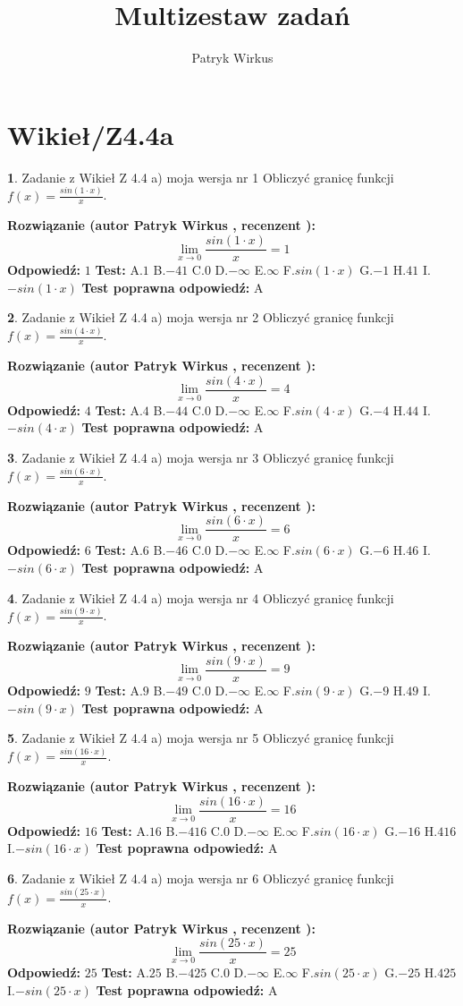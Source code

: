 \documentclass[12pt, a4paper]{article}
\title{Multizestaw zadań}
\author{Patryk Wirkus}
\date{}
\theoremstyle{definition} %
\newtheorem{zad}{}
\newcommand{\kategoria}[1]{\section{#1}}
\newcommand{\zadStart}[1]{\begin{zad}#1\newline}
\newcommand{\zadStop}{\end{zad}}
\newcommand{\rozwStart}[2]{\noindent \textbf{Rozwiązanie (autor #1 , recenzent #2): }\newline}
\newcommand{\rozwStop}{\newline}
\newcommand{\odpStart}{\noindent \textbf{Odpowiedź:}\newline}
\newcommand{\odpStop}{\newline}
\newcommand{\testStart}{\noindent \textbf{Test:}\newline}
\newcommand{\testStop}{\newline}
\newcommand{\kluczStart}{\noindent \textbf{Test poprawna odpowiedź:}\newline}
\newcommand{\kluczStop}{\newline}
\begin{document}
\maketitle

\kategoria{Wikieł/Z4.4a}


\zadStart{Zadanie z Wikieł Z 4.4 a) moja wersja nr 1}
Obliczyć granicę funkcji $f(x)=\frac{sin(1\cdot x)}{x}$.
\zadStop
\rozwStart{Patryk Wirkus}{}
$$\lim\limits_{x\to 0}\frac{sin(1\cdot x)}{x}=
1$$
\rozwStop
\odpStart
$1$
\odpStop
\testStart
A.$1$
B.$-41$
C.$0$
D.$-\infty$
E.$\infty$
F.$sin(1\cdot x)$
G.$-1$
H.$41$
I.$-sin(1\cdot x)$
\testStop
\kluczStart
A
\kluczStop



\zadStart{Zadanie z Wikieł Z 4.4 a) moja wersja nr 2}
Obliczyć granicę funkcji $f(x)=\frac{sin(4\cdot x)}{x}$.
\zadStop
\rozwStart{Patryk Wirkus}{}
$$\lim\limits_{x\to 0}\frac{sin(4\cdot x)}{x}=
4$$
\rozwStop
\odpStart
$4$
\odpStop
\testStart
A.$4$
B.$-44$
C.$0$
D.$-\infty$
E.$\infty$
F.$sin(4\cdot x)$
G.$-4$
H.$44$
I.$-sin(4\cdot x)$
\testStop
\kluczStart
A
\kluczStop



\zadStart{Zadanie z Wikieł Z 4.4 a) moja wersja nr 3}
Obliczyć granicę funkcji $f(x)=\frac{sin(6\cdot x)}{x}$.
\zadStop
\rozwStart{Patryk Wirkus}{}
$$\lim\limits_{x\to 0}\frac{sin(6\cdot x)}{x}=
6$$
\rozwStop
\odpStart
$6$
\odpStop
\testStart
A.$6$
B.$-46$
C.$0$
D.$-\infty$
E.$\infty$
F.$sin(6\cdot x)$
G.$-6$
H.$46$
I.$-sin(6\cdot x)$
\testStop
\kluczStart
A
\kluczStop



\zadStart{Zadanie z Wikieł Z 4.4 a) moja wersja nr 4}
Obliczyć granicę funkcji $f(x)=\frac{sin(9\cdot x)}{x}$.
\zadStop
\rozwStart{Patryk Wirkus}{}
$$\lim\limits_{x\to 0}\frac{sin(9\cdot x)}{x}=
9$$
\rozwStop
\odpStart
$9$
\odpStop
\testStart
A.$9$
B.$-49$
C.$0$
D.$-\infty$
E.$\infty$
F.$sin(9\cdot x)$
G.$-9$
H.$49$
I.$-sin(9\cdot x)$
\testStop
\kluczStart
A
\kluczStop



\zadStart{Zadanie z Wikieł Z 4.4 a) moja wersja nr 5}
Obliczyć granicę funkcji $f(x)=\frac{sin(16\cdot x)}{x}$.
\zadStop
\rozwStart{Patryk Wirkus}{}
$$\lim\limits_{x\to 0}\frac{sin(16\cdot x)}{x}=
16$$
\rozwStop
\odpStart
$16$
\odpStop
\testStart
A.$16$
B.$-416$
C.$0$
D.$-\infty$
E.$\infty$
F.$sin(16\cdot x)$
G.$-16$
H.$416$
I.$-sin(16\cdot x)$
\testStop
\kluczStart
A
\kluczStop



\zadStart{Zadanie z Wikieł Z 4.4 a) moja wersja nr 6}
Obliczyć granicę funkcji $f(x)=\frac{sin(25\cdot x)}{x}$.
\zadStop
\rozwStart{Patryk Wirkus}{}
$$\lim\limits_{x\to 0}\frac{sin(25\cdot x)}{x}=
25$$
\rozwStop
\odpStart
$25$
\odpStop
\testStart
A.$25$
B.$-425$
C.$0$
D.$-\infty$
E.$\infty$
F.$sin(25\cdot x)$
G.$-25$
H.$425$
I.$-sin(25\cdot x)$
\testStop
\kluczStart
A
\kluczStop
\end{document}

